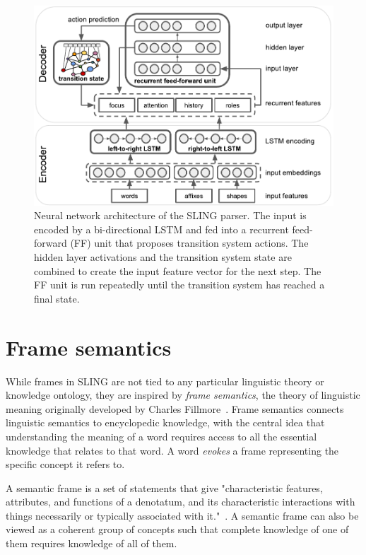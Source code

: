 \documentclass[11pt,a4paper]{article}
\begin{document}
\begin{figure}[t]
  \centering
  \includegraphics[width=1.0\linewidth]{network.pdf}
  \caption{Neural network architecture of the SLING parser. The input is encoded
  by a bi-directional LSTM and fed into a recurrent feed-forward (FF) unit that
  proposes transition system actions.
  The hidden layer activations and the transition system state are combined to
  create the input feature vector for the next step. The FF unit is
  run repeatedly until the transition system has reached a final state.}
  \label{fig:network}
\end{figure}

\section{Frame semantics}
\label{sec:framesem}

While frames in SLING are not tied to any particular linguistic theory or
knowledge ontology, they are inspired by \emph{frame semantics}, the
theory of linguistic meaning originally developed by Charles Fillmore~\cite{fillmore1982}.
Frame semantics connects linguistic semantics to encyclopedic knowledge, with the
central idea that understanding the meaning of a word requires access to all
the essential knowledge that relates to that word. A word \emph{evokes} a frame
representing the specific concept it refers to.

A semantic frame is a set of statements that give "characteristic
features, attributes, and functions of a denotatum, and its characteristic
interactions with things necessarily or typically associated with it."~\cite{alan2001}.
A semantic frame can also be viewed as a coherent group of concepts
such that complete knowledge of one of them requires knowledge of all of them.
\end{document}
